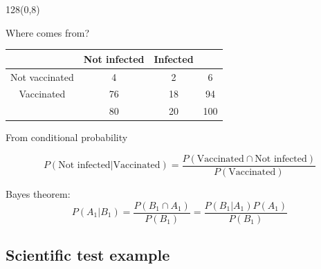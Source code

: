 \documentclass[shownotes]{beamer}
\begin{document}
\begin{frame}
\begin{textblock}{128}(0,8)
\begin{center}
 \Large Where comes from? 
\end{center}
\end{textblock}
\vspace{0.75cm}


\begin{table}[H]
\begin{tabular}{c|c|c|c}
 & Not infected & Infected &  \\ \hline
 Not vaccinated& 4 & 2 & 6 \\ \hline
 Vaccinated& 76 & 18 & 94\\ \hline
 & 80 & 20 & 100
\end{tabular}
\end{table}

\begin{center}
\large From conditional probability
\end{center}

\pause

\begin{equation*}
 P(\text{Not infected}|\text{Vaccinated}) = \frac{P(\text{Vaccinated} \cap \text{Not infected})}{P(\text{Vaccinated})}
\end{equation*}

\pause 

\begin{mdframed}
Bayes theorem:
\begin{equation}
  P(A_1|B_1) = \frac{P(B_1 \cap A_1)}{P(B_1)} = \frac{P(B_1|A_1)P(A_1)}{P(B_1)}
\end{equation}
\end{mdframed}

\end{frame}

\subsection{Scientific test example}
\end{document}

